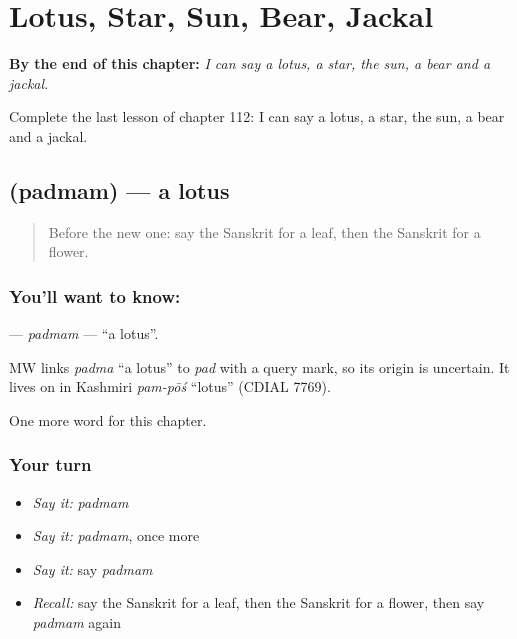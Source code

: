 
\chapter{Lotus, Star, Sun, Bear, Jackal}
\label{ch:sa-lotus-star-sun-bear-jackal}

\begin{chapteropening}
\textbf{By the end of this chapter:} \emph{I can say a lotus, a star, the sun, a bear and a jackal.}

Complete the last lesson of chapter 112: I can say a lotus, a star, the sun, a bear and a jackal.
\end{chapteropening}

\section[\texorpdfstring{\sk{पद्मम्} (padmam)}{पद्मम् (padmam)}]{ (padmam) — a lotus}

\label{lesson:SA-C112-padmam}



\begin{quote}
Before the new one: say the Sanskrit for a leaf, then the Sanskrit for a flower.
\end{quote}

\subsection*{You'll want to know: }
\textbf{} — \emph{padmam} — \textquotedblleft{}a lotus\textquotedblright{}.

\begin{cousinweb}
MW links \emph{padma} \textquotedblleft{}a lotus\textquotedblright{} to \emph{pad} with a query mark, so its origin is uncertain. It lives on in Kashmiri \emph{pam-pōś} \textquotedblleft{}lotus\textquotedblright{} (CDIAL 7769).
\end{cousinweb}

\begin{grammarlens}[title={What you've built}]
One more word for this chapter.
\end{grammarlens}

\subsection*{Your turn}
\begin{itemize}
\raggedright
  \item \emph{Say it:} \emph{padmam}
  \item \emph{Say it:} \emph{padmam}, once more
  \item \emph{Say it:} say \emph{padmam}
  \item \emph{Recall:} say the Sanskrit for a leaf, then the Sanskrit for a flower, then say \emph{padmam} again
\end{itemize}

